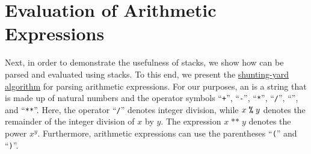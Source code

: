 \section{Evaluation of Arithmetic Expressions}
Next, in order to demonstrate the usefulness of stacks, we show how  can be
parsed and evaluated using stacks.  To this end, we present the
\href{https://en.wikipedia.org/wiki/Shunting-yard_algorithm}{shunting-yard algorithm}
 for parsing arithmetic expressions.  
For our purposes, an  is a string that is made up of natural numbers and
the operator symbols ``\texttt{+}'', ``\texttt{-}'', ``\texttt{*}'', ``\texttt{/}'',
``\texttt{}'', and ``\texttt{**}''. Here, the operator ``\texttt{/}'' denotes integer division,
while $x \;\texttt{\symbol{37}}\; y$ denotes the remainder of the integer division of $x$ by $y$.  The expression $x\;\texttt{**}\;y$ denotes the power $x^y$.
Furthermore, arithmetic expressions can use the parentheses ``\texttt{(}'' and ``\texttt{)}''.
  
